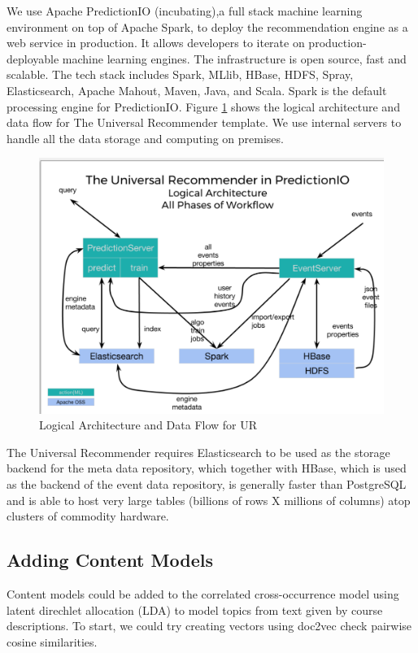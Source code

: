 \documentclass[12pt,journal]{IEEEtran}
\begin{document}
  We use Apache PredictionIO (incubating),a full stack machine learning environment on top of Apache Spark, to deploy the recommendation engine as a web service in production.  It allows developers to iterate on production-deployable machine learning engines.  The infrastructure is open source, fast and scalable.  The tech stack includes Spark, MLlib, HBase, HDFS, Spray, Elasticsearch, Apache Mahout, Maven, Java, and Scala.  Spark is the default processing engine for PredictionIO.  Figure \ref{fig:URdataFlow2} shows the logical architecture and data flow for The Universal Recommender template.  We use internal servers to handle all the data storage and computing on premises.

\begin{figure}[htbp]
\begin{center}
\includegraphics[width=1\columnwidth]{URDataFlow2}
\end{center}
\caption{Logical Architecture and Data Flow for UR}
\label{fig:URdataFlow2}
\end{figure}

The Universal Recommender requires Elasticsearch to be used as the storage backend for the meta data repository, which together with HBase, which is used as the backend of the event data repository, is generally faster than PostgreSQL and is able to host very large tables (billions of rows X millions of columns) atop clusters of commodity hardware.  \cite{UniversalRecommender}



\hfill

\subsection{Adding Content Models}
Content models could be added to the correlated cross-occurrence model using latent direchlet allocation (LDA) to model topics from text given by course descriptions.  To start, we could try creating vectors using doc2vec check pairwise cosine similarities.
\end{document}
